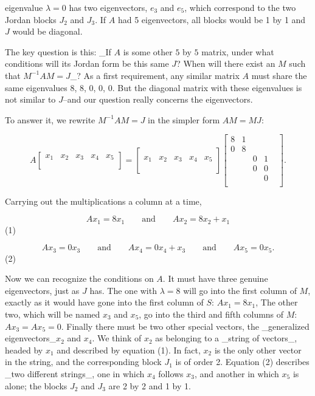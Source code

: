 eigenvalue \(\lambda=0\) has two eigenvectors, \(e_{3}\) and \(e_{5}\), which correspond to the two Jordan blocks \(J_{2}\) and \(J_{3}\). If \(A\) had 5 eigenvectors, all blocks would be 1 by 1 and \(J\) would be diagonal.

The key question is this: _If \(A\) is some other \(5\) by \(5\) matrix, under what conditions will its Jordan form be this same \(J\)? When will there exist an \(M\) such that \(M^{-1}AM=J\)_? As a first requirement, any similar matrix \(A\) must share the same eigenvalues 8, 8, 0, 0, 0. But the diagonal matrix with these eigenvalues is not similar to \(J\)--and our question really concerns the eigenvectors.

To answer it, we rewrite \(M^{-1}AM=J\) in the simpler form \(AM=MJ\):

\[A\left[\begin{matrix}x_{1}&x_{2}&x_{3}&x_{4}&x_{5}\\ &&&&\\ \end{matrix}\right]=\left[\begin{matrix}&&&\\ x_{1}&x_{2}&x_{3}&x_{4}&x_{5}\\ &&&&\\ \end{matrix}\right]\left[\begin{matrix}8&1&&&\\ 0&8&&&\\ &&0&1&\\ &&0&0&\\ &&&0\\ \end{matrix}\right].\]

Carrying out the multiplications a column at a time,

\[Ax_{1}=8x_{1}\qquad\text{and}\qquad Ax_{2}=8x_{2}+x_{1}\] (1)

\[Ax_{3}=0x_{3}\qquad\text{and}\qquad Ax_{4}=0x_{4}+x_{3}\qquad\text{and}\qquad Ax _{5}=0x_{5}.\] (2)

Now we can recognize the conditions on \(A\). It must have three genuine eigenvectors, just as \(J\) has. The one with \(\lambda=8\) will go into the first column of \(M\), exactly as it would have gone into the first column of \(S\): \(Ax_{1}=8x_{1}\), The other two, which will be named \(x_{3}\) and \(x_{5}\), go into the third and fifth columns of \(M\): \(Ax_{3}=Ax_{5}=0\). Finally there must be two other special vectors, the _generalized eigenvectors_\(x_{2}\) and \(x_{4}\). We think of \(x_{2}\) as belonging to a _string of vectors_, headed by \(x_{1}\) and described by equation (1). In fact, \(x_{2}\) is the only other vector in the string, and the corresponding block \(J_{1}\) is of order 2. Equation (2) describes _two different strings_, one in which \(x_{4}\) follows \(x_{3}\), and another in which \(x_{5}\) is alone; the blocks \(J_{2}\) and \(J_{3}\) are 2 by 2 and 1 by 1.

